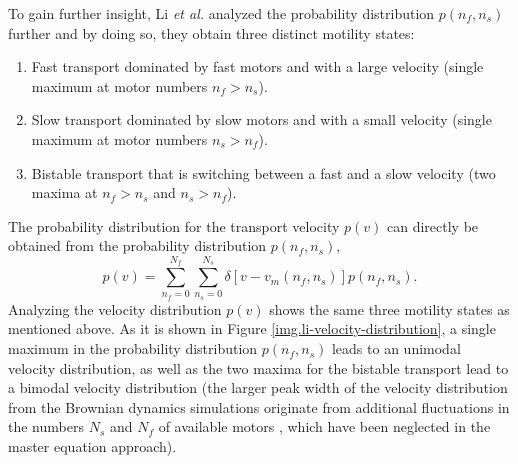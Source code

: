 
To gain further insight, Li \textit{et al.} \cite{li} analyzed the probability distribution $p\left(n_f, n_s\right)$ further and by doing so, they obtain three distinct motility states:

\begin{enumerate}
 \item Fast transport dominated by fast motors and with a large velocity (single maximum at motor numbers \mbox{$n_f > n_s$}).
 \item Slow transport dominated by slow motors and with a small velocity (single maximum at motor numbers \mbox{$n_s > n_f$}).
 \item Bistable transport that is switching between a fast and a slow velocity (two maxima at \mbox{$n_f > n_s$} and \mbox{$n_s > n_f$}).
\end{enumerate}

The probability distribution for the transport velocity $p\left(v\right)$ can directly be obtained from the probability distribution $p\left(n_f, n_s\right)$,
\begin{equation}\label{e.velocity-distribution}
 p\left(v\right) = \sum^{N_f}_{n_f = 0}\sum^{N_s}_{n_s = 0}\delta\left[v - v_m\left(n_f, n_s\right)\right]p\left(n_f, n_s\right).
\end{equation}
Analyzing the velocity distribution $p\left(v\right)$ shows the same three motility states as mentioned above. As it is shown in Figure \ref{img.li-velocity-distribution}, a single maximum in
the probability distribution $p\left(n_f, n_s\right)$ leads to an unimodal velocity distribution, as well as the two maxima for the bistable transport lead to a bimodal velocity distribution
(the larger peak width of the velocity distribution from the Brownian dynamics simulations originate from additional fluctuations in the numbers $N_s$ and $N_f$ of available motors \cite{li},
which have been neglected in the master equation approach).


